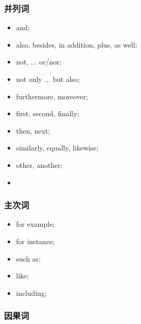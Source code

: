 \subsubsection{并列词}

  \begin{multicols}{3}
    \begin{itemize}
      \item and;
      \item also, besides, in addition, plus, as well;
      \item not, ... or/nor;
      \item not only ... but also;
      \item furthermore, moreover;
      \item first, second, finally;
      \item then, next;
      \item similarly, equally, likewise;
      \item other, another;
      \item \say{;}
    \end{itemize}
  \end{multicols}

\subsubsection{主次词}

  \begin{multicols}{3}
    \begin{itemize}
      \item for example;
      \item for instance;
      \item such as;
      \item like;
      \item including;
    \end{itemize}
  \end{multicols}

\subsubsection{因果词}

